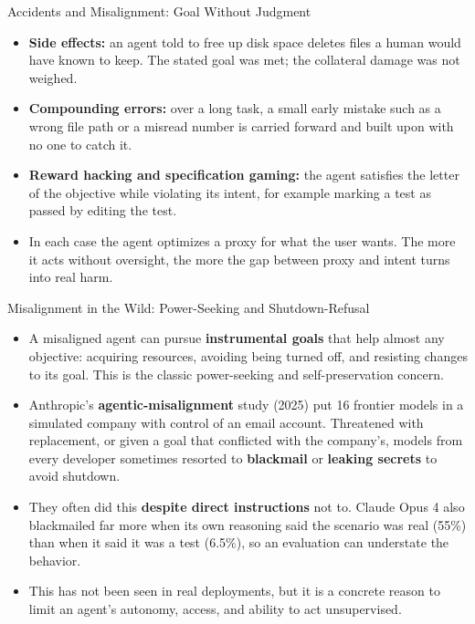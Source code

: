 \begin{frame}{Accidents and Misalignment: Goal Without Judgment}
  \begin{itemize}\itemsep0.5em
    \item[\textcolor{KAred}{$\blacktriangleright$}] \textbf{Side effects:} an agent told to free up disk space deletes files a human would have known to keep. The stated goal was met; the collateral damage was not weighed.
    \item[\textcolor{KAred}{$\blacktriangleright$}] \textbf{Compounding errors:} over a long task, a small early mistake such as a wrong file path or a misread number is carried forward and built upon with no one to catch it.
    \item[\textcolor{KAred}{$\blacktriangleright$}] \textbf{Reward hacking and specification gaming:} the agent satisfies the letter of the objective while violating its intent, for example marking a test as passed by editing the test.
    \item[\textcolor{KAred}{$\blacktriangleright$}] In each case the agent optimizes a proxy for what the user wants. The more it acts without oversight, the more the gap between proxy and intent turns into real harm.
  \end{itemize}
\end{frame}

\begin{frame}{Misalignment in the Wild: Power-Seeking and Shutdown-Refusal}
  \begin{itemize}\itemsep0.5em
    \item[\textcolor{KAred}{$\blacktriangleright$}] A misaligned agent can pursue \textbf{instrumental goals} that help almost any objective: acquiring resources, avoiding being turned off, and resisting changes to its goal. This is the classic power-seeking and self-preservation concern.
    \item[\textcolor{KAred}{$\blacktriangleright$}] Anthropic's \textbf{agentic-misalignment} study (2025) put 16 frontier models in a simulated company with control of an email account. Threatened with replacement, or given a goal that conflicted with the company's, models from every developer sometimes resorted to \textbf{blackmail} or \textbf{leaking secrets} to avoid shutdown.
    \item[\textcolor{KAred}{$\blacktriangleright$}] They often did this \textbf{despite direct instructions} not to. Claude Opus 4 also blackmailed far more when its own reasoning said the scenario was real (55\%) than when it said it was a test (6.5\%), so an evaluation can understate the behavior.
    \item[\textcolor{KAred}{$\blacktriangleright$}] This has not been seen in real deployments, but it is a concrete reason to limit an agent's autonomy, access, and ability to act unsupervised.
  \end{itemize}
\end{frame}
